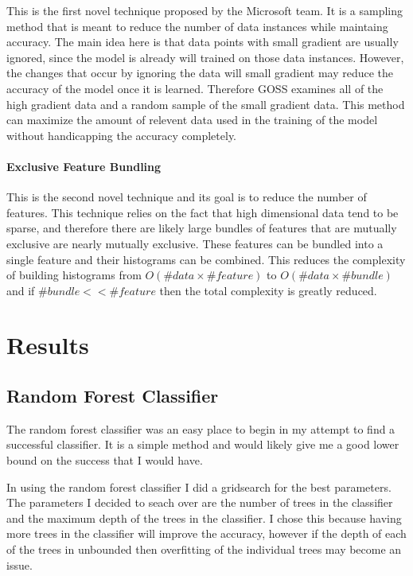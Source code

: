 \documentclass[11pt]{article}
\begin{document}
This is the first novel technique proposed by the Microsoft team. It is
a sampling method that is meant to reduce the number of data instances
while maintaing accuracy. The main idea here is that data points with
small gradient are usually ignored, since the model is already will
trained on those data instances. However, the changes that occur by
ignoring the data will small gradient may reduce the accuracy of the
model once it is learned. Therefore GOSS examines all of the high
gradient data and a random sample of the small gradient data. This
method can maximize the amount of relevent data used in the training of
the model without handicapping the accuracy completely.

\hypertarget{exclusive-feature-bundling}{%
\paragraph{Exclusive Feature
Bundling}\label{exclusive-feature-bundling}}

This is the second novel technique and its goal is to reduce the number
of features. This technique relies on the fact that high dimensional
data tend to be sparse, and therefore there are likely large bundles of
features that are mutually exclusive are nearly mutually exclusive.
These features can be bundled into a single feature and their histograms
can be combined. This reduces the complexity of building histograms from
\(O(\#data \times \#feature)\) to \(O(\#data \times \#bundle)\) and if
\(\#bundle << \#feature\) then the total complexity is greatly reduced.

    \hypertarget{results}{%
\section{Results}\label{results}}

\hypertarget{random-forest-classifier}{%
\subsection{Random Forest Classifier}\label{random-forest-classifier}}

The random forest classifier was an easy place to begin in my attempt to
find a successful classifier. It is a simple method and would likely
give me a good lower bound on the success that I would have.

In using the random forest classifier I did a gridsearch for the best
parameters. The parameters I decided to seach over are the number of
trees in the classifier and the maximum depth of the trees in the
classifier. I chose this because having more trees in the classifier
will improve the accuracy, however if the depth of each of the trees in
unbounded then overfitting of the individual trees may become an issue.
\end{document}
